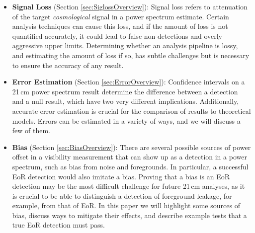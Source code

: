 \documentclass[preprint2,numberedappendix,tighten]{aastex6}  %
\begin{document}
\begin{itemize}
\item \textbf{Signal Loss} (Section \ref{sec:SiglossOverview}): Signal loss refers to attenuation of the target \textit{cosmological} signal 
in a power spectrum estimate. Certain analysis techniques can cause this loss, and if the amount of loss is not quantified accurately, it could lead to false non-detections and overly aggressive upper limits. Determining whether an analysis pipeline is lossy, and estimating the amount of loss if so, has subtle challenges but is necessary to ensure the accuracy of any result. 
\item \textbf{Error Estimation} (Section \ref{sec:ErrorOverview}): Confidence intervals on a 21\,cm power spectrum result 
determine the difference between a detection and a null result, which have two very different implications. Additionally, accurate error estimation is crucial for the comparison of results to theoretical models. Errors can be 
estimated in a variety of ways, and we will discuss a few of them.
\item \textbf{Bias} (Section \ref{sec:BiasOverview}): There are several possible sources of power offset in a visibility 
measurement that can show up as a detection in a power spectrum, such as bias from noise and foregrounds. In particular, a 
successful EoR detection would also imitate a bias. Proving that a bias is an EoR detection may be the most difficult challenge for future 21\,cm 
analyses, as it is crucial to be able to distinguish a detection of foreground leakage, for example, from that of EoR. In this paper 
we will highlight some sources of bias, discuss ways to mitigate their effects, and describe example tests that a true EoR detection must 
pass.
\end{itemize}

\end{document}

